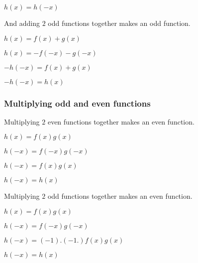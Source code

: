 $h(x)=h(-x)$

And adding \(2\) odd functions together makes an odd function.

$h(x)=f(x)+g(x)$

$h(x)=-f(-x)-g(-x)$

$-h(-x)=f(x)+g(x)$

$-h(-x)=h(x)$

\subsubsection{Multiplying odd and even functions}

Multiplying \(2\) even functions together makes an even function.

$h(x)=f(x)g(x)$

$h(-x)=f(-x)g(-x)$

$h(-x)=f(x)g(x)$

$h(-x)=h(x)$

Multiplying \(2\) odd functions together makes an even function.

$h(x)=f(x)g(x)$

$h(-x)=f(-x)g(-x)$

$h(-x)=(-1).(-1.)f(x)g(x)$

$h(-x)=h(x)$

